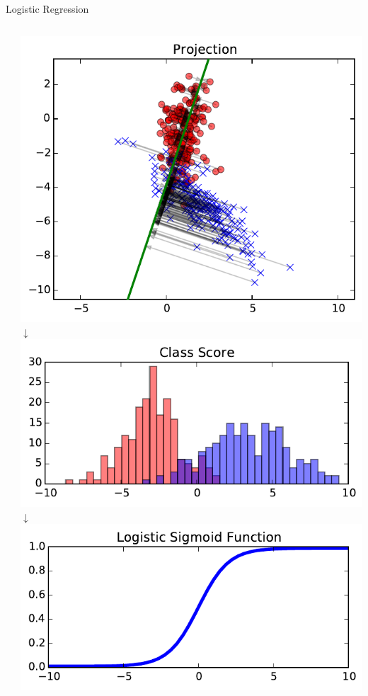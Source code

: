 \documentclass[10pt, aspectratio=169]{beamer} %
\begin{document}
\begin{frame}{Logistic Regression}
\begin{columns}[onlytextwidth]
\begin{columns}[onlytextwidth]
\end{columns}
\begin{center}
	\vspace*{-1cm}
	\includegraphics[width=\textwidth]{LR_proj.pdf}\\
	\vspace*{-0.2cm}$\downarrow$\\
	\includegraphics[width=\textwidth]{LR_score.pdf}\\
	\vspace*{-0.2cm}$\downarrow$\\
	\includegraphics[width=\textwidth]{sigmoid.pdf}\\

\end{center}
\end{columns}
\end{frame}
\end{document}
